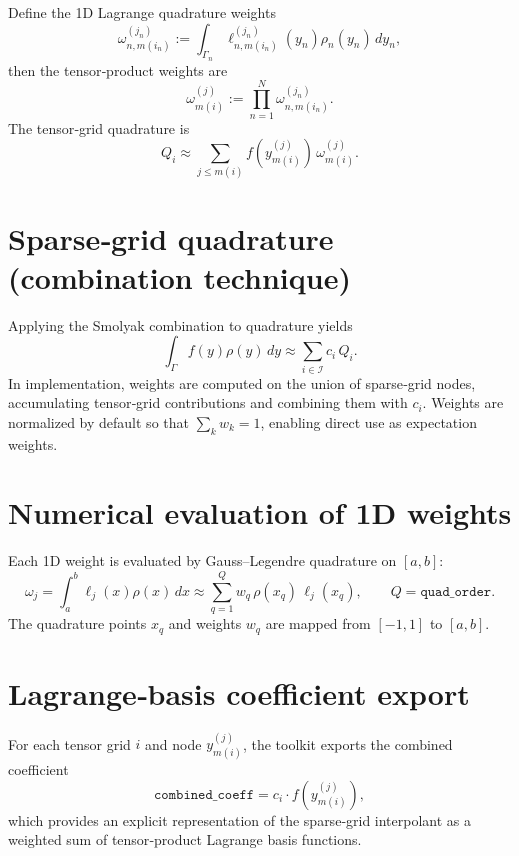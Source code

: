\documentclass[11pt,a4paper]{article}
\begin{document}
Define the 1D Lagrange quadrature weights
\[
\omega^{(j_n)}_{n,m(i_n)} := \int_{\Gamma_n} \ell^{(j_n)}_{n,m(i_n)}(y_n)\rho_n(y_n)\,dy_n,
\]
then the tensor‑product weights are
\[\omega^{(j)}_{m(i)} := \prod_{n=1}^{N} \omega^{(j_n)}_{n,m(i_n)}.\]
The tensor‑grid quadrature is
\[
Q_i \approx \sum_{j \le m(i)} f\!\left(y^{(j)}_{m(i)}\right)\,\omega^{(j)}_{m(i)}.
\]

\section{Sparse‑grid quadrature (combination technique)}

Applying the Smolyak combination to quadrature yields
\[
\int_{\Gamma} f(y)\rho(y)\,dy
\approx
\sum_{i \in \mathcal{I}} c_i\,Q_i.
\]
In implementation, weights are computed on the union of sparse‑grid nodes,
accumulating tensor‑grid contributions and combining them with $c_i$.
Weights are normalized by default so that $\sum_k w_k = 1$, enabling direct
use as expectation weights.

\section{Numerical evaluation of 1D weights}

Each 1D weight is evaluated by Gauss–Legendre quadrature on $[a,b]$:
\[
\omega_j = \int_a^b \ell_j(x)\rho(x)\,dx
\approx \sum_{q=1}^Q w_q\,\rho(x_q)\,\ell_j(x_q),
\qquad Q = \texttt{quad\_order}.
\]
The quadrature points $x_q$ and weights $w_q$ are mapped from $[-1,1]$ to $[a,b]$.

\section{Lagrange‑basis coefficient export}

For each tensor grid $i$ and node $y^{(j)}_{m(i)}$, the toolkit exports the
combined coefficient
\[
\texttt{combined\_coeff} = c_i \cdot f\!\left(y^{(j)}_{m(i)}\right),
\]
which provides an explicit representation of the sparse‑grid interpolant as a
weighted sum of tensor‑product Lagrange basis functions.
\end{document}
